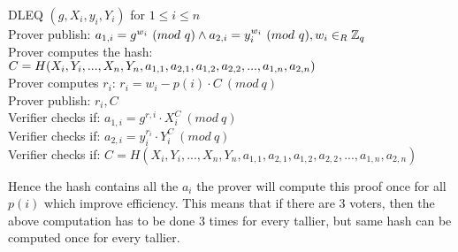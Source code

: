\begin{infobox}
DLEQ \begin{math}(g,X_i,y_i,Y_i) \end{math} for  \begin{math}1\leq i \leq n \end{math}  \\
Prover publish: \begin{math}a_{1,i}=g^{w_i} \ (mod\ q)  \land a_{2,i}=y_i^{w_i} \ (mod\ q),  w_i\in_R \Z_q \end{math}\\
Prover computes the hash: \begin{math}C=H(X_i,Y_i,...,X_n,Y_n,a_{1,1},a_{2,1},\\a_{1,2},a_{2,2},...,a_{1,n},a_{2,n})\end{math}\\
Prover computes \begin{math}r_i\end{math}:  \begin{math}r_i=w_i-p(i)  \cdot  C \ (mod\ q)\end{math}\\
Prover publish:  \begin{math}r_i,C\end{math}\\
Verifier checks if:  \begin{math}a_{1,i} = g^{r,i} \cdot X_i^C \ (mod\ q) \end{math}\\
Verifier checks if:  \begin{math} a_{2,i}=y_i^{r_{i}}  \cdot  Y_i^C \ (mod\ q)\end{math}\\ 
Verifier checks if:  \begin{math}C=H(X_i,Y_i,...,X_n,Y_n,a_{1,1},a_{2,1},a_{1,2},a_{2,2},...,a_{1,n},a_{2,n})\end{math}

\label{info:DLEQ_optimized}
\end{infobox}

 Hence the hash contains all the  \begin{math}a_i \end{math} the prover will compute this proof once for all  \begin{math}p(i) \end{math} which improve efficiency. This means that if there are 3 voters, then the above computation has to be done 3 times for every tallier, but same hash can be computed once for every tallier. 

